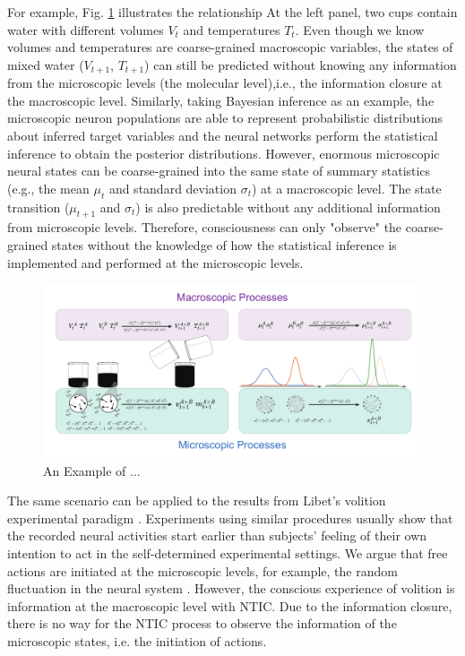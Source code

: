 \documentclass[utf8]{article}
\begin{document}
        For example, Fig. \ref{fig:TemperatureExample} illustrates the relationship 
        At the left panel, two cups contain water with different volumes $V_t$ and temperatures $T_t$. Even though we know volumes and temperatures are coarse-grained macroscopic variables, the states of mixed water ($V_{t+1}$, $T_{t+1}$) can still be predicted without knowing any information from the microscopic levels (the molecular level),i.e., the information closure at the macroscopic level. Similarly, taking Bayesian inference as an example, the microscopic neuron populations are able to represent probabilistic distributions about inferred target variables and the neural networks perform the statistical inference to obtain the posterior distributions. However, enormous microscopic neural states can be coarse-grained into the same state of summary statistics (e.g., the mean $\mu_{t}$  and standard deviation $\sigma_{t}$) at a macroscopic level. The state transition ($\mu_{t+1}$ and $\sigma_{t}$) is also predictable without any additional information from microscopic levels. Therefore, consciousness can only "observe" the coarse-grained states without the knowledge of how the statistical inference is implemented and performed at the microscopic levels. 


		\begin{figure}[H]
			\includegraphics[width=1.3\textwidth]{WritingMaterials/Fig_Temperature_Example/ExampleOfCG.pdf}
			\centering
			\caption{An Example of ...}
			\label{fig:TemperatureExample}
		\end{figure}         
        
        
        The same scenario can be applied to the results from Libet's volition experimental paradigm \citep{Libet1983TimeOC, Libet1985Dec}. Experiments using similar procedures usually show that the recorded neural activities start earlier than subjects' feeling of their own intention to act in the self-determined experimental settings. We argue that free actions are initiated at the microscopic levels, for example, the random fluctuation in the neural system \citep{schurger_accumulator_2012}. However, the conscious experience of volition is information at the macroscopic level with NTIC. Due to the information closure, there is no way for the NTIC process to observe the information of the microscopic states, i.e. the initiation of actions. 
        
\end{document}
